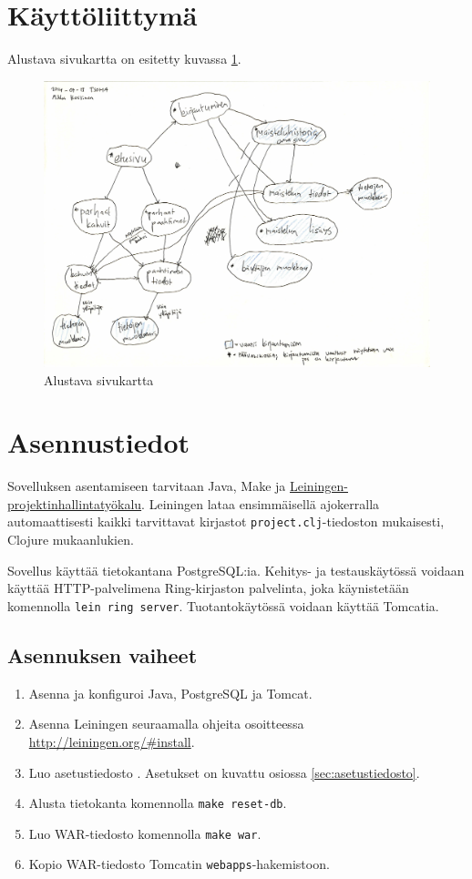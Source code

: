 \documentclass[a4paper,titlepage]{article}
\begin{document}
\section{Käyttöliittymä}

Alustava sivukartta on esitetty kuvassa \ref{fig:sivukartta}.

\begin{figure}[ht]
  \includegraphics[width=12cm]{ui/sitemap}
  \caption{Alustava sivukartta}
  \label{fig:sivukartta}
\end{figure}

\section{Asennustiedot}

Sovelluksen asentamiseen tarvitaan Java, Make ja
\href{http://leiningen.org/}{Leiningen-projektinhallintatyökalu}. Leiningen
lataa ensimmäisellä ajokerralla automaattisesti kaikki tarvittavat
kirjastot \texttt{project.clj}-tiedoston mukaisesti, Clojure
mukaanlukien.

Sovellus käyttää tietokantana PostgreSQL:ia. Kehitys- ja
testauskäytössä voidaan käyttää HTTP-palvelimena Ring-kirjaston
palvelinta, joka käynistetään komennolla \texttt{lein ring
  server}. Tuotantokäytössä voidaan käyttää Tomcatia.

\subsection{Asennuksen vaiheet}

\begin{enumerate}
\item Asenna ja konfiguroi Java, PostgreSQL ja Tomcat.
\item Asenna Leiningen seuraamalla ohjeita osoitteessa \url{http://leiningen.org/#install}.
\item Luo asetustiedosto . Asetukset on
  kuvattu osiossa \ref{sec:asetustiedosto}.
\item Alusta tietokanta komennolla \texttt{make reset-db}.
\item Luo WAR-tiedosto komennolla \texttt{make war}.
\item Kopio WAR-tiedosto Tomcatin \texttt{webapps}-hakemistoon.
\end{enumerate}
\end{document}
